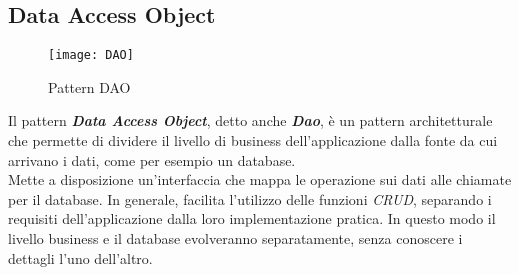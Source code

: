 \subsection*{Data Access Object}
 \begin{figure}[H]
    \centering 
    \texttt{[image: DAO]} 
    \bigskip
    \caption{Pattern DAO}
\end{figure}
Il pattern \textit{\textbf{Data Access Object}}, detto anche \textit{\textbf{Dao}}, è un pattern architetturale che permette di dividere il livello di business dell'applicazione dalla fonte da cui arrivano i dati, come per esempio un database. \\
Mette a disposizione un'interfaccia che mappa le operazione sui dati alle chiamate per il database. In generale, facilita l'utilizzo delle funzioni \textit{CRUD}, separando i requisiti dell'applicazione dalla loro implementazione pratica. In questo modo il livello business e il database evolveranno separatamente, senza conoscere i dettagli l'uno dell'altro.
